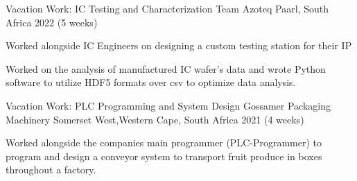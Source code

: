 

\begin{cventries}

  \cventry
{Vacation Work: IC Testing and Characterization Team} %
{Azoteq} %
{Paarl, South Africa} %
{2022 (5 weeks)} %
{
	\begin{cvitems} %
		\item {Worked alongside IC Engineers on designing a custom testing station for their IP}
		\item {Worked on the analysis of manufactured IC wafer's data and wrote Python software to utilize HDF5 formats over csv to optimize data analysis.}
	\end{cvitems}
}


  \cventry
    {Vacation Work: PLC Programming and System Design} %
    {Gossamer Packaging Machinery} %
    {Somerset West,Western Cape, South Africa} %
    {2021 (4 weeks)} %
    {
      \begin{cvitems} %
        \item {Worked alongside the companies main programmer (PLC-Programmer) to program and design a conveyor system to transport fruit produce in boxes throughout a factory.}
      \end{cvitems}
    }



\end{cventries}
